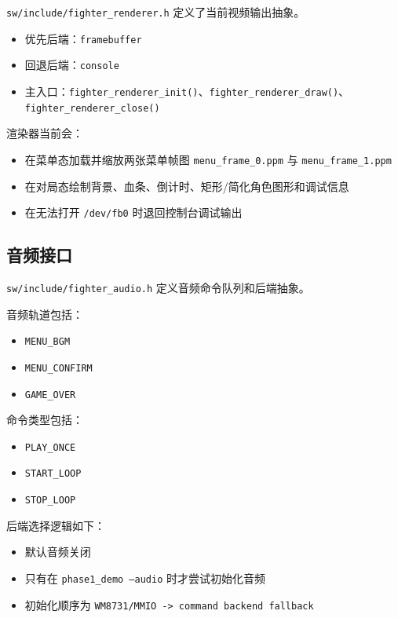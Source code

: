 \documentclass[12pt,a4paper]{ctexart}
\begin{document}
\texttt{sw/include/fighter\_renderer.h} 定义了当前视频输出抽象。

\begin{itemize}
  \item 优先后端：\texttt{framebuffer}
  \item 回退后端：\texttt{console}
  \item 主入口：\texttt{fighter\_renderer\_init()}、\texttt{fighter\_renderer\_draw()}、\texttt{fighter\_renderer\_close()}
\end{itemize}

渲染器当前会：

\begin{itemize}
  \item 在菜单态加载并缩放两张菜单帧图 \texttt{menu\_frame\_0.ppm} 与 \texttt{menu\_frame\_1.ppm}
  \item 在对局态绘制背景、血条、倒计时、矩形/简化角色图形和调试信息
  \item 在无法打开 \texttt{/dev/fb0} 时退回控制台调试输出
\end{itemize}

\subsection{音频接口}

\texttt{sw/include/fighter\_audio.h} 定义音频命令队列和后端抽象。

音频轨道包括：

\begin{itemize}
  \item \texttt{MENU\_BGM}
  \item \texttt{MENU\_CONFIRM}
  \item \texttt{GAME\_OVER}
\end{itemize}

命令类型包括：

\begin{itemize}
  \item \texttt{PLAY\_ONCE}
  \item \texttt{START\_LOOP}
  \item \texttt{STOP\_LOOP}
\end{itemize}

后端选择逻辑如下：

\begin{itemize}
  \item 默认音频关闭
  \item 只有在 \texttt{phase1\_demo --audio} 时才尝试初始化音频
  \item 初始化顺序为 \texttt{WM8731/MMIO -> command backend fallback}
\end{itemize}
\end{document}
